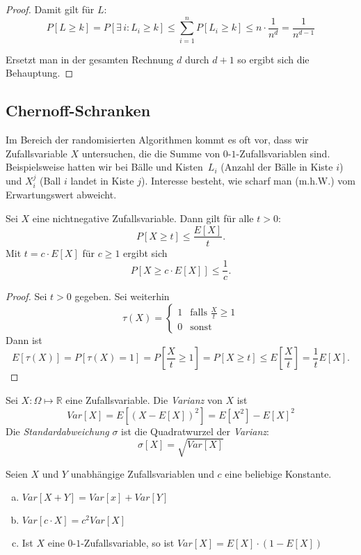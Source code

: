\begin{proof}
	Damit gilt für $L$:
	\[
	  P[L \geq k] = P\left[ \exists\,i : L_i \geq k \right] \leq
	  \sum_{i=1}^n P[L_i \geq k] \leq n \cdot \frac{1}{n^d} =
	  \frac{1}{n^{d-1}}
	\]

	Ersetzt man in der gesamten Rechnung $d$ durch $d+1$ so ergibt sich die
	Behauptung.
\end{proof}
\subsection{Chernoff-Schranken}
Im Bereich der randomisierten Algorithmen kommt es oft vor, dass wir
Zufallsvariable $X$ untersuchen, die die Summe von $0$-$1$-Zufallsvariablen
sind. Beispielsweise hatten wir bei \glqq Bälle und Kisten\grqq\ $L_i$ (Anzahl
der Bälle in Kiste $i$) und $X_i^j$ (Ball $i$ landet in Kiste $j$). Interesse
besteht, wie scharf man (m.h.W.) vom Erwartungswert abweicht.
\begin{satz}
	Sei $X$ eine nichtnegative Zufallsvariable. Dann gilt für alle $t > 0$:
	\[
	  P[X \geq t] \leq \frac{E[X]}{t}.
	\]
	Mit $t = c \cdot E[X]$ für $c \geq 1$ ergibt sich
	\[
	  P\left[X \geq c \cdot E[X]\right] \leq \frac{1}{c}.
	\]
\end{satz}
\begin{proof}
	Sei $t > 0$ gegeben. Sei weiterhin 
	\[
	  \tau(X) = \begin{cases} 1 & \text{falls } \frac{X}{t} \geq 1 \\ 0 &
		  \text{sonst} \end{cases}
	\]
	Dann ist
	\[
	  E[\tau(X)] = P[\tau(X)=1] = P\left[\frac{X}{t} \geq 1\right] = P[X
	  \geq t] \leq E\left[\frac{X}{t}\right] = \frac{1}{t} E[X].
	\]
\end{proof}
\begin{defn}
	Sei $X : \Omega \mapsto \mathbb{R}$ eine Zufallsvariable. Die \emph{Varianz} von $X$ ist
	\[
	  Var[X] = E\left[\left(X - E[X]\right)^2 \right] = E\left[X^2\right] - E[X]^2
	\]
	Die \emph{Standardabweichung} $\sigma$ ist die Quadratwurzel der \emph{Varianz}:
	\[
	  \sigma[X] = \sqrt{Var[X]}
	\]
\end{defn}
\begin{satz}
	Seien $X$ und $Y$ unabhängige Zufallsvariablen und $c$ eine beliebige Konstante.
	\begin{enumerate}[(a)]
		\item $Var[X+Y] = Var[x] + Var[Y]$
		\item $Var[c\cdot X] = c^2 Var[X]$
		\item Ist $X$ eine $0$-$1$-Zufallsvariable, so ist $Var[X] =
			E[X] \cdot \left(1 - E[X]\right)$
	\end{enumerate}
\end{satz}
